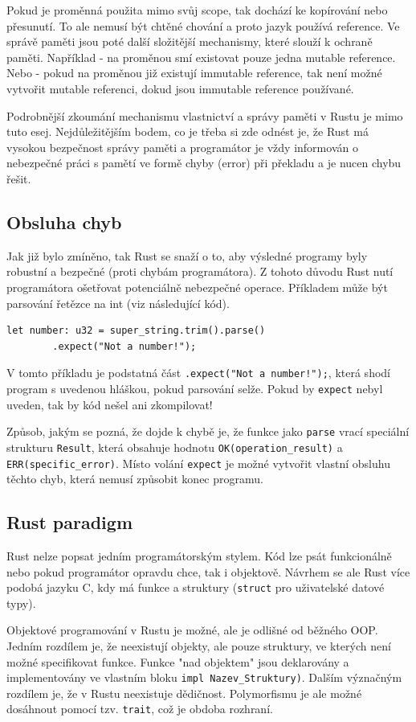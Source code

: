 \documentclass[12pt, letterpaper]{article}
\begin{document}
Pokud je proměnná použita mimo svůj scope, tak dochází
ke kopírování nebo přesunutí. To ale nemusí být chtěné chování a proto jazyk používá reference. Ve správě
paměti jsou poté další složitější mechanismy, které slouží k ochraně paměti. Například - na proměnou smí
existovat pouze jedna mutable reference. Nebo - pokud na proměnou již existují immutable reference, tak
není možné vytvořit mutable referenci, dokud jsou immutable reference používané.

Podrobnější zkoumání mechanismu vlastnictví a správy paměti v Rustu je mimo tuto esej. Nejdůležitějším
bodem, co je třeba si zde odnést je, že Rust má vysokou bezpečnost správy paměti a programátor je vždy
informován o nebezpečné práci s pamětí ve formě chyby (error) při překladu a je nucen chybu řešit.
%
\subsection{Obsluha chyb}
Jak již bylo zmíněno, tak Rust se snaží o to, aby výsledné programy byly robustní a bezpečné (proti chybám
programátora). Z tohoto důvodu Rust nutí programátora ošetřovat potenciálně nebezpečné operace. Příkladem
může být parsování řetězce na int (viz následující kód).
%
\begin{lstlisting}
let number: u32 = super_string.trim().parse()
		.expect("Not a number!");
\end{lstlisting}
%
V tomto příkladu je podstatná část \texttt{.expect("Not a number!");}, která shodí program s uvedenou hláškou,
pokud parsování selže. Pokud by \texttt{expect} nebyl uveden, tak by kód nešel ani zkompilovat!

Způsob, jakým
se pozná, že dojde k chybě je, že funkce jako \texttt{parse} vrací speciální strukturu \texttt{Result}, která
obsahuje hodnotu \texttt{OK(operation\_result)} a \texttt{ERR(specific\_error)}. Místo volání \texttt{expect}
je možné vytvořit vlastní obsluhu těchto chyb, která nemusí způsobit konec programu.
%
\subsection{Rust paradigm}
Rust nelze popsat jedním programátorským stylem. Kód lze psát funkcionálně nebo pokud programátor opravdu chce,
tak i objektově. Návrhem se ale Rust více podobá jazyku C, kdy má funkce a struktury (\texttt{struct} pro 
uživatelské datové typy).

Objektové programování v Rustu je možné, ale je odlišné od běžného OOP. Jedním rozdílem je, že neexistují
objekty, ale pouze struktury, ve kterých není možné specifikovat funkce. Funkce "nad objektem" jsou
deklarovány a implementovány ve vlastním bloku \texttt{impl Nazev\_Struktury)}. Dalším význačným rozdílem
je, že v Rustu neexistuje dědičnost. Polymorfismu je ale možné dosáhnout pomocí tzv. \texttt{trait}, což
je obdoba rozhraní.
%
\end{document}
